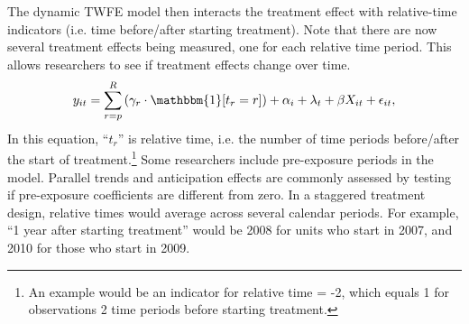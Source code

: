 \documentclass[12pt]{article}
\begin{document}
The dynamic TWFE model then interacts the treatment effect with relative-time indicators (i.e. time before/after starting treatment). Note that there are now several treatment effects being measured, one for each relative time period. This allows researchers to see if treatment effects change over time.
\begin{equation}
    y_{it} = \sum_{r=p}^R\left(\gamma_r\cdot\mathbbm{1}[t_r=r]\right) + \alpha_i + \lambda_t + \beta X_{it} + \epsilon_{it},    
\end{equation}
In this equation, “$t_r$” is relative time, i.e. the number of time periods before/after the start of treatment.\footnote{An example would be an indicator for relative time = -2, which equals 1 for observations 2 time periods before starting treatment.} Some researchers include pre-exposure periods in the model.  Parallel trends and anticipation effects are commonly assessed by testing if pre-exposure coefficients are different from zero. In a staggered treatment design, relative times would average across several calendar periods. For example, “1 year after starting treatment” would be 2008 for units who start in 2007, and 2010 for those who start in 2009.
\end{document}

